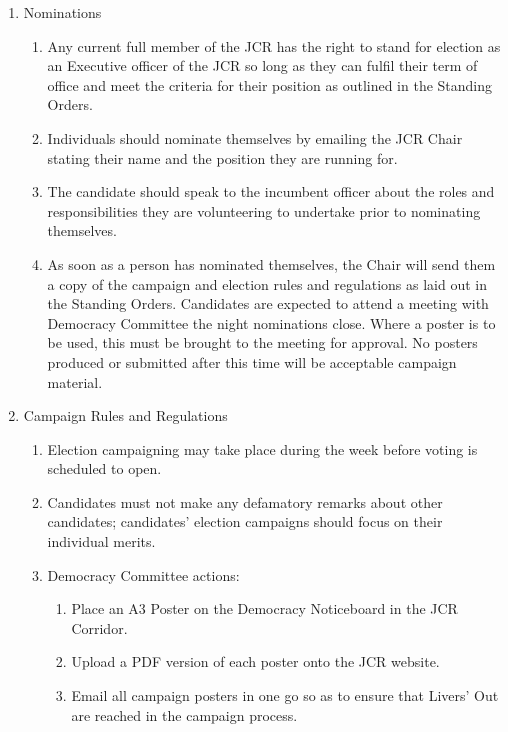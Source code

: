 \begin{enumerate}
    \item Nominations
    \begin{enumerate}
        \item Any current full member of the JCR has the right to stand for election as an Executive officer of the JCR so long as they can fulfil their term of office and meet the criteria for their position as outlined in the Standing Orders.
        \item Individuals should nominate themselves by emailing the JCR Chair stating their name and the position they are running for.
        \item The candidate should speak to the incumbent officer about the roles and responsibilities they are volunteering to undertake prior to nominating themselves.
        \item As soon as a person has nominated themselves, the Chair will send them a copy of the campaign and election rules and regulations as laid out in the Standing Orders. Candidates are expected to attend a meeting with Democracy Committee the night nominations close. Where a poster is to be used, this must be brought to the meeting for approval. No posters produced or submitted after this time will be acceptable campaign material.
    \end{enumerate}
    \item Campaign Rules and Regulations
    \begin{enumerate}
        \item Election campaigning may take place during the week before voting is scheduled to open.
        \item Candidates must not make any defamatory remarks about other candidates; candidates’ election
        campaigns should focus on their individual merits.
        \item Democracy Committee actions:
        \begin{enumerate}
            \item Place an A3 Poster on the Democracy Noticeboard in the JCR Corridor.
            \item Upload a PDF version of each poster onto the JCR website.
            \item Email all campaign posters in one go so as to ensure that Livers’ Out are reached in the campaign process.
        \end{enumerate}

\end{enumerate}
\end{enumerate}
